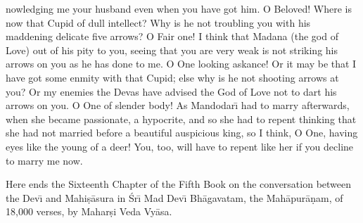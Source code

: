 nowledging me your husband even when you have got him. O Beloved! Where is now that Cupid of dull intellect? Why is he not troubling you with his maddening delicate five arrows? O Fair one! I think that Madana (the god of Love) out of his pity to you, seeing that you are very weak is not striking his arrows on you as he has done to me. O One looking askance! Or it may be that I have got some enmity with that Cupid; else why is he not shooting arrows at you? Or my enemies the Devas have advised the God of Love not to dart his arrows on you. O One of slender body! As Mandodar\={\i} had to marry afterwards, when she became passionate, a hypocrite, and so she had to repent thinking that she had not married before a beautiful auspicious king, so I think, O One, having eyes like the young of a deer! You, too, will have to repent like her if you decline to marry me now.

Here ends the Sixteenth Chapter of the Fifth Book on the conversation between the Dev\={\i} and Mahi\d{s}\=asura in \'Sr\={\i} Mad Dev\={\i} Bh\=agavatam, the Mah\=apur\=a\d{n}am, of 18,000 verses, by Mahar\d{s}i Veda Vy\=asa.



